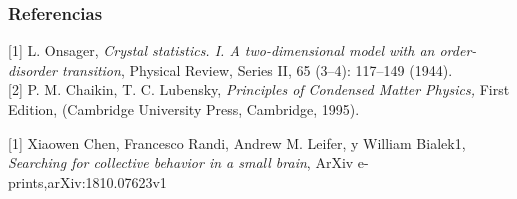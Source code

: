 \documentclass{beamer}
\begin{document}
\begin{frame}
\frametitle{Referencias}

[1] L. Onsager, {\it Crystal statistics. I. A two-dimensional model with an order-disorder transition}, Physical Review, Series II, 65 (3–4): 117–149 (1944).\\

[2] P. M. Chaikin,  T. C. Lubensky, {\it Principles of Condensed Matter Physics,} First Edition, (Cambridge University Press, Cambridge, 1995).

[1] Xiaowen Chen, Francesco Randi, Andrew M. Leifer, y William Bialek1, {\it Searching for collective behavior in a small brain}, ArXiv e-prints,arXiv:1810.07623v1


\end{frame}
\end{document}
